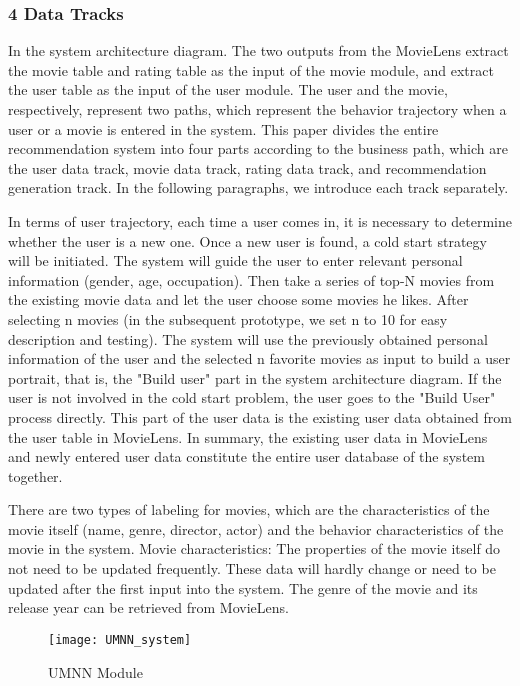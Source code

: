 \subsubsection{4 Data Tracks}
In the system architecture diagram. The two outputs from the MovieLens extract the movie table and rating table as the input of the movie module, and extract the user table as the input of the user module. The user and the movie, respectively, represent two paths, which represent the behavior trajectory when a user or a movie is entered in the system. This paper divides the entire recommendation system into four parts according to the business path, which are the user data track, movie data track, rating data track, and recommendation generation track. In the following paragraphs, we introduce each track separately.
\par In terms of user trajectory, each time a user comes in, it is necessary to determine whether the user is a new one. Once a new user is found, a cold start strategy will be initiated. The system will guide the user to enter relevant personal information (gender, age, occupation). Then take a series of top-N movies from the existing movie data and let the user choose some movies he likes. After selecting n movies (in the subsequent prototype, we set n to 10 for easy description and testing). The system will use the previously obtained personal information of the user and the selected n favorite movies as input to build a user portrait, that is, the "Build user" part in the system architecture diagram. If the user is not involved in the cold start problem, the user goes to the "Build User" process directly. This part of the user data is the existing user data obtained from the user table in MovieLens. In summary, the existing user data in MovieLens and newly entered user data constitute the entire user database of the system together.
\par There are two types of labeling for movies, which are the characteristics of the movie itself (name, genre, director, actor) and the behavior characteristics of the movie in the system.
Movie characteristics:
The properties of the movie itself do not need to be updated frequently. These data will hardly change or need to be updated after the first input into the system. The genre of the movie and its release year can be retrieved from MovieLens.
\begin{figure}[h]
\caption{UMNN Module}
\centering
\texttt{[image: UMNN\_system]}
\end{figure}
